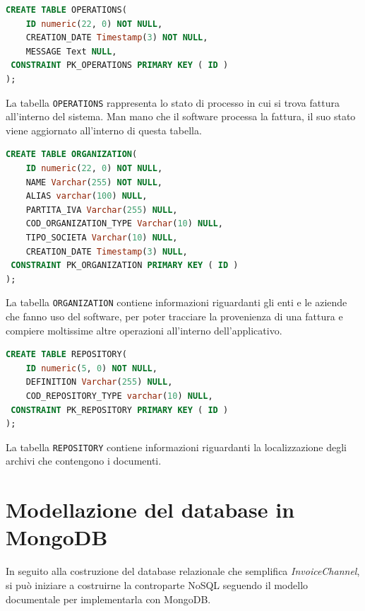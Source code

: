 \begin{lstlisting}[language=SQL,
        deletekeywords={IDENTITY,INT},
        morekeywords={clustered},    
        framesep=10pt,
        framextopmargin=10pt, style=sql_style]
CREATE TABLE OPERATIONS(
    ID numeric(22, 0) NOT NULL,
    CREATION_DATE Timestamp(3) NOT NULL,
    MESSAGE Text NULL,
 CONSTRAINT PK_OPERATIONS PRIMARY KEY ( ID )
);
\end{lstlisting}
\noindent La tabella \texttt{OPERATIONS} rappresenta lo stato di processo in cui si trova fattura all'interno del sistema. Man mano che il software processa la fattura, il suo stato viene aggiornato all'interno di questa tabella.\\

\begin{lstlisting}[language=SQL,
        deletekeywords={IDENTITY,INT},
        morekeywords={clustered},    
        framesep=10pt,
        framextopmargin=10pt, style=sql_style]
CREATE TABLE ORGANIZATION(
    ID numeric(22, 0) NOT NULL,
    NAME Varchar(255) NOT NULL,
    ALIAS varchar(100) NULL,
    PARTITA_IVA Varchar(255) NULL,
    COD_ORGANIZATION_TYPE Varchar(10) NULL,
    TIPO_SOCIETA Varchar(10) NULL,
    CREATION_DATE Timestamp(3) NULL,
 CONSTRAINT PK_ORGANIZATION PRIMARY KEY ( ID )
);
\end{lstlisting}
\noindent La tabella \texttt{ORGANIZATION} contiene informazioni riguardanti gli enti e le aziende che fanno uso del software, per poter tracciare la provenienza di una fattura e compiere moltissime altre operazioni all'interno dell'applicativo.\\

\begin{lstlisting}[language=SQL,
        deletekeywords={IDENTITY,INT},
        morekeywords={clustered},    
        framesep=10pt,
        framextopmargin=10pt, style=sql_style]
CREATE TABLE REPOSITORY(
    ID numeric(5, 0) NOT NULL,
    DEFINITION Varchar(255) NULL,
    COD_REPOSITORY_TYPE varchar(10) NULL,
 CONSTRAINT PK_REPOSITORY PRIMARY KEY ( ID )
);
\end{lstlisting}
\noindent La tabella \texttt{REPOSITORY} contiene informazioni riguardanti la localizzazione degli archivi che contengono i documenti. \\


\section{Modellazione del database in MongoDB}
In seguito alla costruzione del database relazionale che semplifica \textit{InvoiceChannel}, si può iniziare a costruirne la controparte NoSQL seguendo il modello documentale per implementarla con MongoDB.\\

